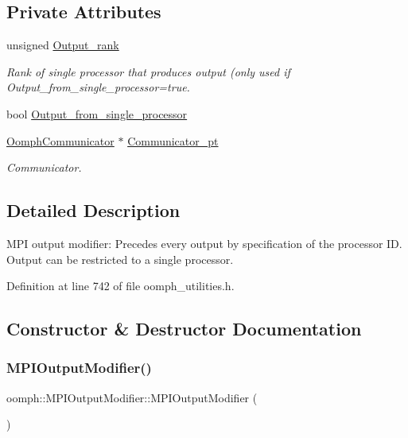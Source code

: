\subsection*{Private Attributes}
\begin{DoxyCompactItemize}
\item 
unsigned \hyperlink{classoomph_1_1MPIOutputModifier_ad255e5084d5a8df94597711a096d3863}{Output\+\_\+rank}
\begin{DoxyCompactList}\small\item\em Rank of single processor that produces output (only used if Output\+\_\+from\+\_\+single\+\_\+processor=true. \end{DoxyCompactList}\item 
bool \hyperlink{classoomph_1_1MPIOutputModifier_a9fbc25a8b8187f1669fcbfefa47dacd0}{Output\+\_\+from\+\_\+single\+\_\+processor}
\item 
\hyperlink{classoomph_1_1OomphCommunicator}{Oomph\+Communicator} $\ast$ \hyperlink{classoomph_1_1MPIOutputModifier_a93306d57a0a753eb7a7735c78f7e4360}{Communicator\+\_\+pt}
\begin{DoxyCompactList}\small\item\em Communicator. \end{DoxyCompactList}\end{DoxyCompactItemize}


\subsection{Detailed Description}
M\+PI output modifier\+: Precedes every output by specification of the processor ID. Output can be restricted to a single processor. 

Definition at line 742 of file oomph\+\_\+utilities.\+h.



\subsection{Constructor \& Destructor Documentation}
\mbox{\label{classoomph_1_1MPIOutputModifier_a3f9c2bd12d8f68daa52c7eb3e5d0ac00}} 
\subsubsection{\texorpdfstring{M\+P\+I\+Output\+Modifier()}{MPIOutputModifier()}}
{\footnotesize\ttfamily oomph\+::\+M\+P\+I\+Output\+Modifier\+::\+M\+P\+I\+Output\+Modifier (\begin{DoxyParamCaption}{ }\end{DoxyParamCaption})\hspace{0.3cm}{\ttfamily [inline]}}



